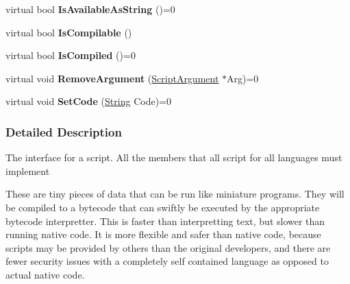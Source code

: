 \begin{DoxyCompactItemize}
\item 
\hypertarget{classMezzanine_1_1Scripting_1_1Script_af7351a14b9f1e56dde085f53723d3b5d}{
virtual bool {\bfseries IsAvailableAsString} ()=0}
\label{classMezzanine_1_1Scripting_1_1Script_af7351a14b9f1e56dde085f53723d3b5d}

\item 
\hypertarget{classMezzanine_1_1Scripting_1_1Script_a33426cd4b08b4078fda249a00c821005}{
virtual bool {\bfseries IsCompilable} ()}
\label{classMezzanine_1_1Scripting_1_1Script_a33426cd4b08b4078fda249a00c821005}

\item 
\hypertarget{classMezzanine_1_1Scripting_1_1Script_ac920f191e8df2814427341e59c423aa6}{
virtual bool {\bfseries IsCompiled} ()=0}
\label{classMezzanine_1_1Scripting_1_1Script_ac920f191e8df2814427341e59c423aa6}

\item 
\hypertarget{classMezzanine_1_1Scripting_1_1Script_ab3ffb918b28e518fa1145253ff37c900}{
virtual void {\bfseries RemoveArgument} (\hyperlink{classMezzanine_1_1Scripting_1_1ScriptArgument}{ScriptArgument} $\ast$Arg)=0}
\label{classMezzanine_1_1Scripting_1_1Script_ab3ffb918b28e518fa1145253ff37c900}

\item 
\hypertarget{classMezzanine_1_1Scripting_1_1Script_aae36c7fa4c78d5aac838bfca7c112ce2}{
virtual void {\bfseries SetCode} (\hyperlink{namespaceMezzanine_acf9fcc130e6ebf08e3d8491aebcf1c86}{String} Code)=0}
\label{classMezzanine_1_1Scripting_1_1Script_aae36c7fa4c78d5aac838bfca7c112ce2}

\end{DoxyCompactItemize}


\subsubsection{Detailed Description}
The interface for a script. All the members that all script for all languages must implement \par
 \par
 These are tiny pieces of data that can be run like miniature programs. They will be compiled to a bytecode that can swiftly be executed by the appropriate bytecode interpretter. This is faster than interpretting text, but slower than running native code. It is more flexible and safer than native code, because scripts may be provided by others than the original developers, and there are fewer security issues with a completely self contained language as opposed to actual native code. 

